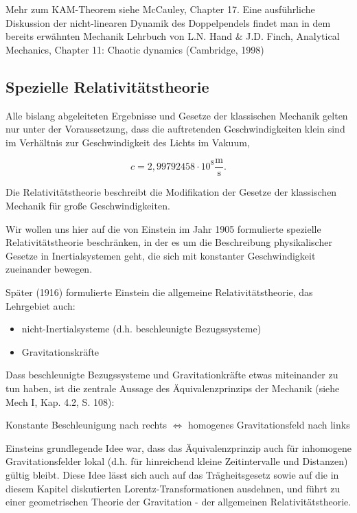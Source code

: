\documentclass[10pt, letterpaper]{article}
\begin{document}
Mehr zum KAM-Theorem siehe McCauley, Chapter 17.
Eine ausführliche Diskussion der nicht-linearen Dynamik des Doppelpendels findet man in dem bereits erwähnten Mechanik Lehrbuch von L.N. Hand \& J.D. Finch, Analytical Mechanics, Chapter 11: Chaotic dynamics (Cambridge, 1998)








\pagebreak



\subsection{Spezielle Relativitätstheorie}

Alle bislang abgeleiteten Ergebnisse und Gesetze der klassischen Mechanik gelten nur unter der Voraussetzung, dass die auftretenden Geschwindigkeiten klein sind im Verhältnis zur Geschwindigkeit des Lichts im Vakuum,

\[ c = 2,9979 24 58 \cdot 10^8 \frac{\text{m}}{\text{s}}. \]

Die Relativitätstheorie beschreibt die Modifikation der Gesetze der klassischen Mechanik für große Geschwindigkeiten.

Wir wollen uns hier auf die von Einstein im Jahr 1905 formulierte spezielle Relativitätstheorie beschränken, in der es um die Beschreibung physikalischer Gesetze in Inertialsystemen geht, die sich mit konstanter Geschwindigkeit zueinander bewegen.

Später (1916) formulierte Einstein die allgemeine Relativitätstheorie, das Lehrgebiet auch:
\begin{itemize}
\item nicht-Inertialsysteme (d.h. beschleunigte Bezugssysteme)
\item Gravitationskräfte
\end{itemize}

Dass beschleunigte Bezugssysteme und Gravitationkräfte etwas miteinander zu tun haben, ist die zentrale Aussage des Äquivalenzprinzips der Mechanik (siehe Mech I, Kap. 4.2, S. 108):

Konstante Beschleunigung nach rechts $\Leftrightarrow$ homogenes Gravitationsfeld nach links

Einsteins grundlegende Idee war, dass das Äquivalenzprinzip auch für inhomogene Gravitationsfelder lokal (d.h. für
hinreichend kleine Zeitintervalle und Distanzen) gültig bleibt.
Diese Idee lässt sich auch auf das Trägheitsgesetz sowie auf die in diesem Kapitel diskutierten Lorentz-Transformationen ausdehnen, und führt zu einer geometrischen Theorie der Gravitation - der allgemeinen Relativitätstheorie.
\end{document}
